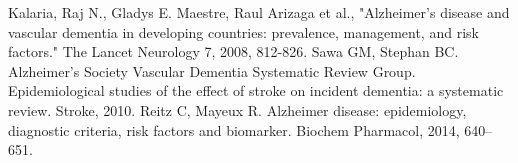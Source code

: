 \documentclass[12pt,letterpaper]{article}
\begin{document}
\begin{thebibliography}{}
 Kalaria, Raj N., Gladys E. Maestre, Raul Arizaga et al., "Alzheimer's disease and vascular dementia in developing countries: prevalence, management, and risk factors." The Lancet Neurology 7, 2008, 812-826.
 Sawa GM, Stephan BC. Alzheimer's Society Vascular Dementia Systematic Review Group. Epidemiological studies of the effect of stroke on incident dementia: a systematic review. Stroke, 2010.
 Reitz C, Mayeux R. Alzheimer disease: epidemiology, diagnostic criteria, risk factors and biomarker. Biochem Pharmacol, 2014, 640–651.

\end{thebibliography}
\end{document}
